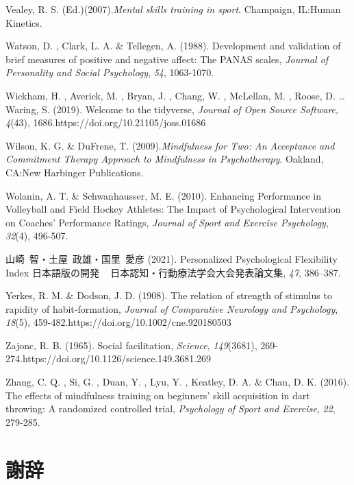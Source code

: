 \documentclass[12pt,a4paper,xelatex,ja=standard]{bxjsarticle}
\begin{document}
Vealey, R. S. (Ed.)(2007).\emph{Mental skills training in sport}.
Champaign, IL:Human Kinetics.

Watson, D. , Clark, L. A. \& Tellegen, A. (1988). Development and
validation of brief measures of positive and negative affect: The PANAS
scales, \emph{Journal of Personality and Social Psychology}, \emph{54},
1063-1070.

Wickham, H. , Averick, M. , Bryan, J. , Chang, W. , McLellan, M. ,
Roose, D. \ldots Waring, S. (2019). Welcome to the tidyverse,
\emph{Journal of Open Source Software}, \emph{4}(43),
1686.https://doi.org/10.21105/joss.01686

Wilson, K. G. \& DuFrene, T.
(2009).\emph{Mindfulness for Two: An Acceptance and Commitment Therapy Approach to Mindfulness in Psychotherapy}.
Oakland, CA:New Harbinger Publications.

Wolanin, A. T. \& Schwanhausser, M. E. (2010). Enhancing Performance in
Volleyball and Field Hockey Athletes: The Impact of Psychological
Intervention on Coaches' Performance Ratings,
\emph{Journal of Sport and Exercise Psychology}, \emph{32}(4), 496-507.

山崎~智・土屋~政雄・国里~愛彦 (2021). Personalized Psychological
Flexibility Index 日本語版の開発 ~ 日本認知・行動療法学会大会発表論文集,
\emph{47}, 386--387.

Yerkes, R. M. \& Dodson, J. D. (1908). The relation of strength of
stimulus to rapidity of habit-formation,
\emph{Journal of Comparative Neurology and Psychology}, \emph{18}(5),
459-482.https://doi.org/10.1002/cne.920180503

Zajonc, R. B. (1965). Social facilitation, \emph{Science},
\emph{149}(3681), 269-274.https://doi.org/10.1126/science.149.3681.269

Zhang, C. Q. , Si, G. , Duan, Y. , Lyu, Y. , Keatley, D. A. \& Chan, D.
K. (2016). The effects of mindfulness training on beginners' skill
acquisition in dart throwing: A randomized controlled trial,
\emph{Psychology of Sport and Exercise}, \emph{22}, 279-285.

\endgroup

\clearpage

\hypertarget{ux8b1dux8f9e}{%
\section{謝辞}\label{ux8b1dux8f9e}}
\end{document}
